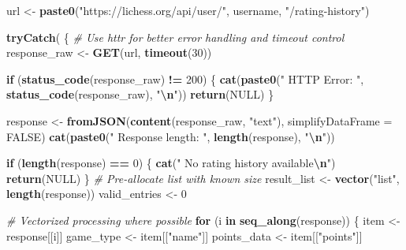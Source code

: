 \documentclass[
]{article}
\newenvironment{Shaded}{\begin{snugshade}}{\end{snugshade}}
\newcommand{\AttributeTok}[1]{\textcolor[rgb]{0.13,0.29,0.53}{#1}}
\newcommand{\CommentTok}[1]{\textcolor[rgb]{0.56,0.35,0.01}{\textit{#1}}}
\newcommand{\ConstantTok}[1]{\textcolor[rgb]{0.56,0.35,0.01}{#1}}
\newcommand{\ControlFlowTok}[1]{\textcolor[rgb]{0.13,0.29,0.53}{\textbf{#1}}}
\newcommand{\DecValTok}[1]{\textcolor[rgb]{0.00,0.00,0.81}{#1}}
\newcommand{\FunctionTok}[1]{\textcolor[rgb]{0.13,0.29,0.53}{\textbf{#1}}}
\newcommand{\NormalTok}[1]{#1}
\newcommand{\OtherTok}[1]{\textcolor[rgb]{0.56,0.35,0.01}{#1}}
\newcommand{\SpecialCharTok}[1]{\textcolor[rgb]{0.81,0.36,0.00}{\textbf{#1}}}
\newcommand{\StringTok}[1]{\textcolor[rgb]{0.31,0.60,0.02}{#1}}
\begin{document}
\begin{Shaded}
\begin{Highlighting}[]
\NormalTok{        url }\OtherTok{\textless{}{-}} \FunctionTok{paste0}\NormalTok{(}\StringTok{"https://lichess.org/api/user/"}\NormalTok{, username, }\StringTok{"/rating{-}history"}\NormalTok{)}

        \FunctionTok{tryCatch}\NormalTok{(}
\NormalTok{            \{}
                \CommentTok{\# Use httr for better error handling and timeout control}
\NormalTok{                response\_raw }\OtherTok{\textless{}{-}} \FunctionTok{GET}\NormalTok{(url, }\FunctionTok{timeout}\NormalTok{(}\DecValTok{30}\NormalTok{))}

                \ControlFlowTok{if}\NormalTok{ (}\FunctionTok{status\_code}\NormalTok{(response\_raw) }\SpecialCharTok{!=} \DecValTok{200}\NormalTok{) \{}
                    \FunctionTok{cat}\NormalTok{(}\FunctionTok{paste0}\NormalTok{(}\StringTok{"  HTTP Error: "}\NormalTok{, }\FunctionTok{status\_code}\NormalTok{(response\_raw), }\StringTok{"}\SpecialCharTok{\textbackslash{}n}\StringTok{"}\NormalTok{))}
                    \FunctionTok{return}\NormalTok{(}\ConstantTok{NULL}\NormalTok{)}
\NormalTok{                \}}

\NormalTok{                response }\OtherTok{\textless{}{-}} \FunctionTok{fromJSON}\NormalTok{(}\FunctionTok{content}\NormalTok{(response\_raw, }\StringTok{"text"}\NormalTok{), }\AttributeTok{simplifyDataFrame =} \ConstantTok{FALSE}\NormalTok{)}
                \FunctionTok{cat}\NormalTok{(}\FunctionTok{paste0}\NormalTok{(}\StringTok{"  Response length: "}\NormalTok{, }\FunctionTok{length}\NormalTok{(response), }\StringTok{"}\SpecialCharTok{\textbackslash{}n}\StringTok{"}\NormalTok{))}

                \ControlFlowTok{if}\NormalTok{ (}\FunctionTok{length}\NormalTok{(response) }\SpecialCharTok{==} \DecValTok{0}\NormalTok{) \{}
                    \FunctionTok{cat}\NormalTok{(}\StringTok{"  No rating history available}\SpecialCharTok{\textbackslash{}n}\StringTok{"}\NormalTok{)}
                    \FunctionTok{return}\NormalTok{(}\ConstantTok{NULL}\NormalTok{)}
\NormalTok{                \}}
                \CommentTok{\# Pre{-}allocate list with known size}
\NormalTok{                result\_list }\OtherTok{\textless{}{-}} \FunctionTok{vector}\NormalTok{(}\StringTok{"list"}\NormalTok{, }\FunctionTok{length}\NormalTok{(response))}
\NormalTok{                valid\_entries }\OtherTok{\textless{}{-}} \DecValTok{0}

                \CommentTok{\# Vectorized processing where possible}
                \ControlFlowTok{for}\NormalTok{ (i }\ControlFlowTok{in} \FunctionTok{seq\_along}\NormalTok{(response)) \{}
\NormalTok{                    item }\OtherTok{\textless{}{-}}\NormalTok{ response[[i]]}
\NormalTok{                    game\_type }\OtherTok{\textless{}{-}}\NormalTok{ item[[}\StringTok{"name"}\NormalTok{]]}
\NormalTok{                    points\_data }\OtherTok{\textless{}{-}}\NormalTok{ item[[}\StringTok{"points"}\NormalTok{]]}


\end{Highlighting}
\end{Shaded}
\end{document}
